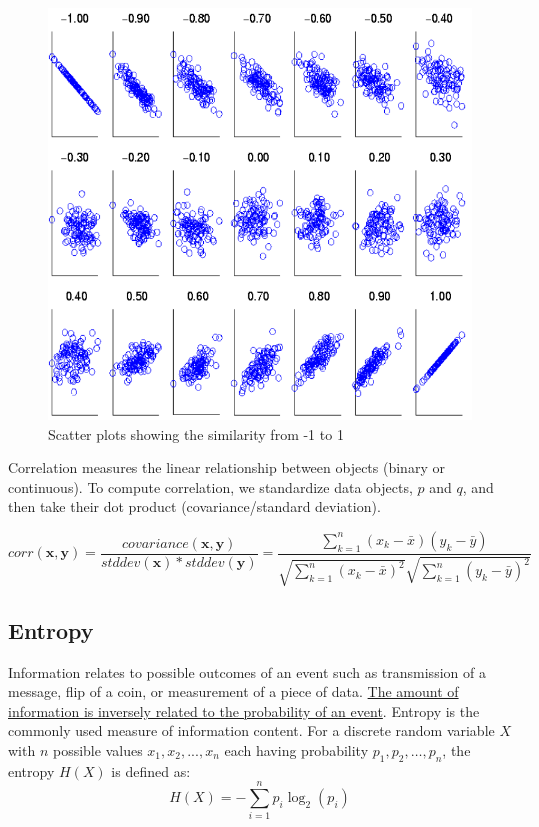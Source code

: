 \begin{paracol}{2}
	
	\begin{figure}[htbp]
		\centering
		\includegraphics{images/04/correlation.png}
		\caption{Scatter plots showing the similarity from -1 to 1}
		\label{fig:04/correlation}
	\end{figure}
	\switchcolumn
	\colfill
	Correlation measures the linear relationship between objects (binary or continuous).
	To compute correlation, we standardize data objects, $p$ and $q$, and then take their dot product (covariance/standard deviation).
	\colfill
\end{paracol}
	\[
		corr(\mathbf{x},\mathbf{y}) = \frac{covariance(\mathbf{x},\mathbf{y})}{stddev(\mathbf{x})*stddev(\mathbf{y})} = \frac{\sum_{k=1}^{n}(x_k - \bar{x})(y_k - \bar{y})}{\sqrt{\sum_{k=1}^{n}(x_k - \bar{x})^2}\sqrt{\sum_{k=1}^{n}(y_k - \bar{y})^2}}
		\]
		

\subsection{Entropy}
Information relates to possible outcomes of an event such as transmission of a message, flip of a coin, or measurement of a piece of data.
\ul{The amount of information is inversely related to the probability of an event}.
Entropy is the commonly used measure of information content.
For a discrete random variable $X$ with $n$ possible values ${x_1, x_2, ..., x_n}$ each having probability $p_1,p_2,\dots,p_n$, the entropy $H(X)$ is defined as:
\[
H(X) = -\sum_{i=1}^{n} p_i \log_2(p_i)
\]

